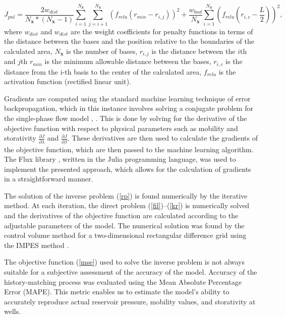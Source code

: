 \documentclass[
11pt,%
tightenlines,%
twoside,%
onecolumn,%
nofloats,%
nobibnotes,%
nofootinbib,%
superscriptaddress,%
noshowpacs,%
centertags]%
{revtex4}
\begin{document}
\begin{equation} \label{pnl}
	J_{pnl}=\frac{2w_{dist}}{N_\textbf{x}*(N_\textbf{x}-1)}\sum_{i=1}^{N_\textbf{x}}{\sum_{j=i+1 }^{N_\textbf{x}}{\left(f_{relu}\left(r_{min} - r_{i,j}\right)\right)^2}} + 
	\frac{w_{bnd}}{N_\textbf{x}}\sum_{i=1}^{N_\textbf{x}}{\left(f_{relu}\left(r_{i,c} - \frac{L}{2}\right)\right)^2},
\end{equation}
where $w_{dist}$ and $w_{dist}$ are the weight coefficients for penalty functions in terms of the distance between the bases and the position relative to the boundaries of the calculated area, $N_\textbf{x}$ is the number of bases, $r_{i,j}$ is the distance between the $i$th and $j$th $r_{min}$ is the minimum allowable distance between the bases, $r_{i,c}$ is the distance from the i-th basis to the center of the calculated area, $f_{relu}$ is the activation function (rectified linear unit).

Gradients are computed using the standard machine learning technique of error backpropagation, which in this instance involves solving a conjugate problem for the single-phase flow model  \cite{kos3}, \cite{far}. This is done by solving for the derivative of the objective function with respect to physical parameters such as mobility and storativity $\frac{\partial J}{\partial \lambda}$ and $\frac{\partial J}{\partial \beta}$. These derivatives are then used to calculate the gradients of the objective function, which are then passed to the machine learning algorithm. The Flux library \cite{inn}, written in the Julia programming language, was used to implement the presented approach, which allows for the calculation of gradients in a straightforward manner.


The solution of the inverse problem (\ref{rp}) is found  numerically
by the iterative method. At each iteration, the direct problem
(\ref{fil})--(\ref{kr}) is numerically solved and the derivatives of
the objective function are calculated according to the adjustable
parameters of the model. The numerical solution was found
by the control volume method for a two-dimensional rectangular
difference grid using the IMPES method \cite{azi}.

The objective function ({\ref{mse}}) used to solve the inverse problem is not always suitable for a subjective assessment of the accuracy of the model. Accuracy of the history-matching process was evaluated using the Mean Absolute Percentage Error (MAPE). This metric enables us to estimate the model's ability to accurately reproduce actual reservoir pressure, mobility values, and storativity at wells.
\end{document}
